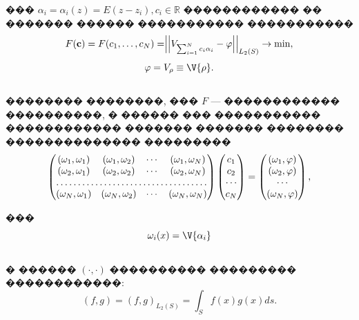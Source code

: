 \documentclass[a4paper]{article}
\begin{document}
��� $\alpha_i=\alpha_i(z)=E(z-z_i),c_i \in \mathbb{R}$ ������������ �� ������� ������ ����������� �����������
\begin{equation}
  F({\bf c})=F(c_1,\dots,c_N)=\Bigr|\Bigr|V_{\sum_{i=1}^N c_i \alpha_i} -\varphi\Bigr|\Bigr|_{L_2(S)} \rightarrow \min,
\end{equation}
\begin{equation*}
  \varphi =V_{\rho} \equiv \V{\rho}.
\end{equation*}
\\
�������� ��������, ��� $F$ --- ������������ ����������, � ������ ��� ����������� ������������ ������� ������� �������� �������������� ���������
\begin{equation}
  \begin{pmatrix}
    (\omega_1, \omega_1) & (\omega_1, \omega_2) & \cdots & (\omega_1, \omega_N) \\
    (\omega_2, \omega_1) & (\omega_2, \omega_2) & \cdots & (\omega_2, \omega_N) \\
    \hdotsfor{4}                                                                \\
    (\omega_N, \omega_1) & (\omega_N, \omega_2) & \cdots & (\omega_N, \omega_N) \\
  \end{pmatrix}
  \begin{pmatrix}
    c_1    \\
    c_2    \\
    \cdots \\
    c_N    \\
  \end{pmatrix}
  =
  \begin{pmatrix}
    (\omega_1,\varphi) \\
    (\omega_2,\varphi) \\
    \cdots             \\
    (\omega_N,\varphi) \\
  \end{pmatrix},
  \label{gram}
\end{equation}

���
\\
\begin{equation}
  \omega_i(x)=\V{\alpha_i}
\end{equation}
\\
� ������ $(\cdot,\cdot)$ ���������� ��������� ������������:
\begin{equation}
  (f,g)=(f,g)_{L_2(S)}=\int_S f(x)g(x) ds.
\end{equation}
\end{document}
